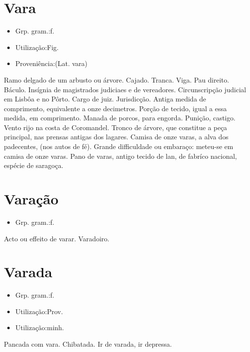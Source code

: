 \documentclass{article}
\begin{document}
\section{Vara}
\begin{itemize}
\item {Grp. gram.:f.}
\end{itemize}
\begin{itemize}
\item {Utilização:Fig.}
\end{itemize}
\begin{itemize}
\item {Proveniência:(Lat. \textunderscore vara\textunderscore )}
\end{itemize}
Ramo delgado de um arbusto ou árvore.
Cajado.
Tranca.
Viga.
Pau direito.
Báculo.
Insígnia de magistrados judiciaes e de vereadores.
Circunscripção judicial em Lisbôa e no Pôrto.
Cargo de juiz.
Jurisdicção.
Antiga medida de comprimento, equivalente a onze decimetros.
Porção de tecido, igual a essa medida, em comprimento.
Manada de porcos, para engorda.
Punição, castigo.
Vento rijo na costa de Coromandel.
Tronco de árvore, que constitue a peça principal, nas prensas antigas dos lagares.
\textunderscore Camisa de onze varas\textunderscore , a alva dos padecentes, (nos autos de fé).
Grande difficuldade ou embaraço: \textunderscore meteu-se em camisa de onze varas\textunderscore .
\textunderscore Pano de varas\textunderscore , antigo tecido de lan, de fabríco nacional, espécie de saragoça.
\section{Varação}
\begin{itemize}
\item {Grp. gram.:f.}
\end{itemize}
Acto ou effeito de varar.
Varadoiro.
\section{Varada}
\begin{itemize}
\item {Grp. gram.:f.}
\end{itemize}
\begin{itemize}
\item {Utilização:Prov.}
\end{itemize}
\begin{itemize}
\item {Utilização:minh.}
\end{itemize}
Pancada com vara.
Chibatada.
\textunderscore Ir de varada\textunderscore , ir depressa.
\end{document}
